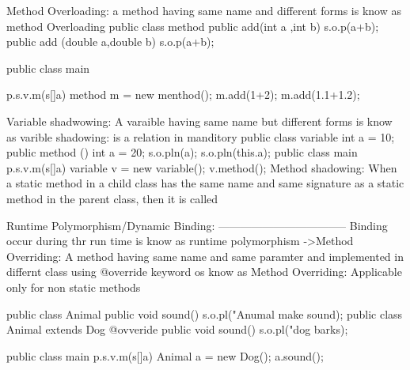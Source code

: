 Method Overloading:
           a method having same name and different forms is know as method Overloading
           public class method{
              public  add(int a ,int b){
                 s.o.p(a+b);
                 }
              public add (double a,double b){
                  s.o.p(a+b);
                  }
                  }

          public class main{
             p.s.v.m(s[]a){
                 method m = new menthod();
                 m.add(1+2);
                 m.add(1.1+1.2);
                 }


Variable shadwowing:
          A varaible having same name but different forms is know as varible shadowing:
          is a relation in manditory
          public class variable{
                    int a = 10;
              public method (){
                    int a = 20;
                    s.o.pln(a);
                    s.o.pln(this.a);
                    }
                    }
          public class main{
              p.s.v.m(s[]a){
                    variable v = new variable();
                    v.method();
                    }
                    }
Method shadowing:
         When a static method in a child class has the same name and same signature as a static method in the parent class, then it is called 

Runtime Polymorphism/Dynamic Binding:
-----------------------------------
          Binding occur during thr run time is know as runtime polymorphism
                    ->Method Overriding:
                              A method having same name and same paramter and implemented in differnt class using @override keyword os know as Method Overriding:
                              Applicable only for non static methods

                    public class Animal{
                              public void sound(){
                               s.o.pl("Anumal make sound);
                               }
                               }
                    public class Animal extends Dog{
                              @ovveride
                              public void sound(){
                              s.o.pl("dog barks);
                              }
                              }

                    public class main{
                              p.s.v.m(s[]a){
                              Animal a = new Dog();
                                a.sound();
                                }
                                }

}
